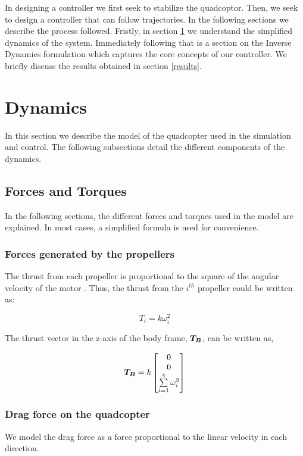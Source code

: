 \documentclass[12pt,fleqn]{article}
\newcommand{\mbm}[1]{\mbox{\boldmath $#1$}}
\begin{document}
In designing a controller we first seek to stabilize the
quadcoptor. Then, we seek to design a controller that can follow
trajectories. In the following sections we describe the process
followed. Fristly, in section \ref{dynamics} we understand the
simplified dynamics of the system. Immediately following that is a
section on the Inverse Dynamics formulation which captures the core
concepts of our controller. We briefly discuss the results obtained in
section \ref{results}.

\section{Dynamics}
\label{dynamics}
In this section we describe the model of the quadcopter used in the
simulation and control. The following subsections detail the different
components of the dynamics.

\subsection{Forces and Torques}

In the following sections, the different forces and torques used in
the model are explained. In most cases, a simplified formula is used
for convenience. 

\subsubsection{Forces generated by the propellers}

The thrust from each propeller is proportional to the square of the
angular velocity of the motor \cite{Andrew}. Thus, the thrust from the
$i^{th}$ propeller could be written as:

$$ T_i = k\omega_i^2 $$

The thrust vector in the z-axis of the body frame, $\mbm{T_{B}}$, can
be written as, 

\begin{equation} \label{thrust}
$$ \mbm{T_{B}} = k \begin{bmatrix}0 \\ 0\\ \sum \limits_{i=1}^{4}
  \omega_i^2 \end{bmatrix} $$
\end{equation}

\subsubsection{Drag force on the quadcopter}
We model the drag force as a force proportional to the linear velocity
in each direction. 
\end{document}

